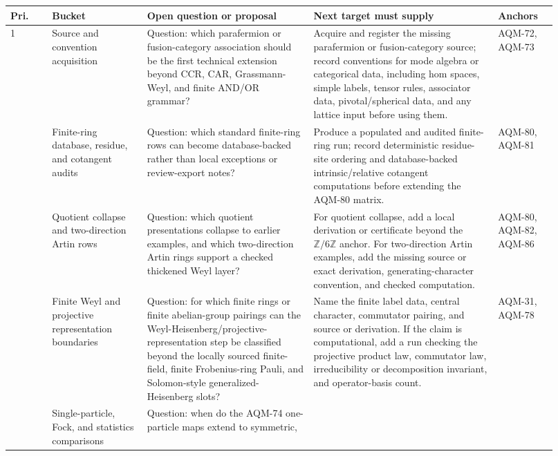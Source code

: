 \begin{center}
\scriptsize\setlength{\tabcolsep}{3pt}
\begin{tabular}{p{0.07\linewidth}p{0.16\linewidth}p{0.28\linewidth}p{0.31\linewidth}p{0.10\linewidth}}
\toprule
Pri. & Bucket & Open question or proposal & Next target must supply & Anchors \\
\midrule
1 &
Source and convention acquisition &
Question: which parafermion or fusion-category association should be the
first technical extension beyond CCR, CAR, Grassmann-Weyl, and finite
AND/OR grammar? &
Acquire and register the missing parafermion or fusion-category source;
record conventions for mode algebra or categorical data, including hom
spaces, simple labels, tensor rules, associator data, pivotal/spherical data,
and any lattice input before using them. &
AQM-72, AQM-73 \\
\addlinespace
2 &
Finite-ring database, residue, and cotangent audits &
Question: which standard finite-ring rows can become database-backed rather
than local exceptions or review-export notes? &
Produce a populated and audited finite-ring run; record deterministic
residue-site ordering and database-backed intrinsic/relative cotangent
computations before extending the AQM-80 matrix. &
AQM-80, AQM-81 \\
\addlinespace
3 &
Quotient collapse and two-direction Artin rows &
Question: which quotient presentations collapse to earlier examples, and
which two-direction Artin rings support a checked thickened Weyl layer? &
For quotient collapse, add a local derivation or certificate beyond the
\(\mathbb Z/6\mathbb Z\) anchor.  For two-direction Artin examples, add the
missing source or exact derivation, generating-character convention, and
checked computation. &
AQM-80, AQM-82, AQM-86 \\
\addlinespace
4 &
Finite Weyl and projective representation boundaries &
Question: for which finite rings or finite abelian-group pairings can the
Weyl-Heisenberg/projective-representation step be classified beyond the
locally sourced finite-field, finite Frobenius-ring Pauli, and Solomon-style
generalized-Heisenberg slots? &
Name the finite label data, central character, commutator pairing, and
source or derivation.  If the claim is computational, add a run checking the
projective product law, commutator law, irreducibility or decomposition
invariant, and operator-basis count. &
AQM-31, AQM-78 \\
\addlinespace
5 &
Single-particle, Fock, and statistics comparisons &
Question: when do the AQM-74 one-particle maps extend to symmetric,

\end{tabular}
\end{center}

